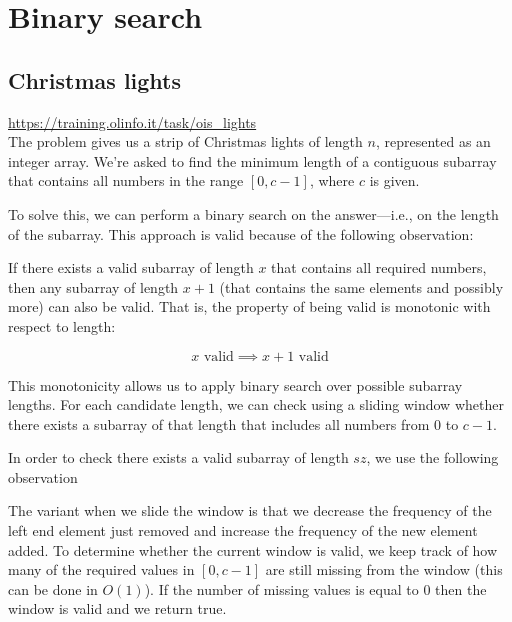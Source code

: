 \section{Binary search}

\subsection{Christmas lights}
\url{https://training.olinfo.it/task/ois_lights}
\\

The problem gives us a strip of Christmas lights of length $n$, represented as an integer array. We're asked to find the minimum length of a contiguous subarray that contains all numbers in the range $[0, c-1]$, where $c$ is given.

To solve this, we can perform a binary search on the answer—i.e., on the length of the subarray. This approach is valid because of the following observation:

If there exists a valid subarray of length $x$ that contains all required numbers, then any subarray of length $x+1$ (that contains the same elements and possibly more) can also be valid. That is, the property of being valid is monotonic with respect to length:

$$ x \text{ valid}  \implies x+1 \text{ valid} $$

This monotonicity allows us to apply binary search over possible subarray lengths. For each candidate length, we can check using a sliding window whether there exists a subarray of that length that includes all numbers from $0$ to $c-1$.

In order to check there exists a valid subarray of length $sz$, we use the following observation
\begin{obs}
    The variant when we slide the window is that we decrease the frequency of the left end element just removed and increase the frequency of the new element added. To determine whether the current window is valid, we keep track of how many of the required values in $[0, c - 1]$ are still missing from the window (this can be done in $O(1)$). If the number of missing values is equal to 0 then the window is valid and we return true.
\end{obs}

